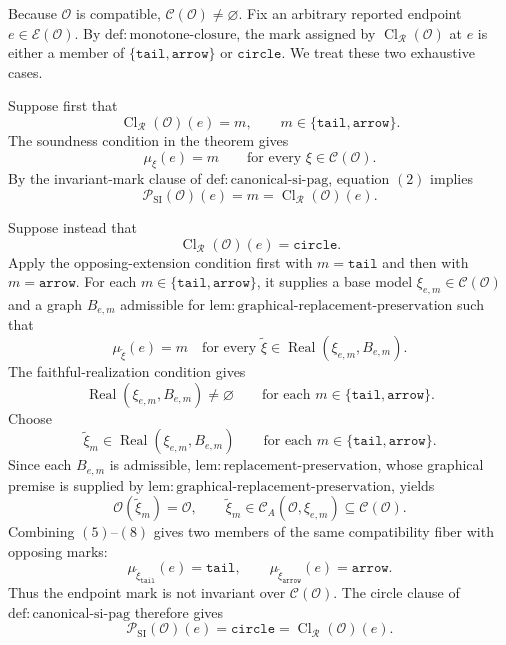 Because \(\mathcal O\) is compatible, \(\mathcal C(\mathcal O)\neq\varnothing\).  Fix an arbitrary reported endpoint \(e\in\mathcal E(\mathcal O)\).  By \(\mathrm{def:monotone\mbox{-}closure}\), the mark assigned by \(\operatorname{Cl}_{\mathcal R}(\mathcal O)\) at \(e\) is either a member of \(\{\mathtt{tail},\mathtt{arrow}\}\) or \(\mathtt{circle}\).  We treat these two exhaustive cases.

Suppose first that
\[
 \operatorname{Cl}_{\mathcal R}(\mathcal O)(e)=m,
 \qquad m\in\{\mathtt{tail},\mathtt{arrow}\}.
 \tag{1}
\]
The soundness condition in the theorem gives
\[
 \mu_\xi(e)=m
 \qquad\text{for every }\xi\in\mathcal C(\mathcal O).
 \tag{2}
\]
By the invariant-mark clause of \(\mathrm{def:canonical\mbox{-}si\mbox{-}pag}\), equation \((2)\) implies
\[
 \mathcal P_{\mathrm{SI}}(\mathcal O)(e)=m
 =\operatorname{Cl}_{\mathcal R}(\mathcal O)(e).
 \tag{3}
\]

Suppose instead that
\[
 \operatorname{Cl}_{\mathcal R}(\mathcal O)(e)=\mathtt{circle}.
 \tag{4}
\]
Apply the opposing-extension condition first with \(m=\mathtt{tail}\) and then with \(m=\mathtt{arrow}\).  For each \(m\in\{\mathtt{tail},\mathtt{arrow}\}\), it supplies a base model \(\xi_{e,m}\in\mathcal C(\mathcal O)\) and a graph \(B_{e,m}\) admissible for \(\mathrm{lem:graphical\mbox{-}replacement\mbox{-}preservation}\) such that
\[
 \mu_{\widetilde\xi}(e)=m
 \quad\text{for every }
 \widetilde\xi\in\operatorname{Real}(\xi_{e,m},B_{e,m}).
 \tag{5}
\]
The faithful-realization condition gives
\[
 \operatorname{Real}(\xi_{e,m},B_{e,m})\neq\varnothing
 \qquad\text{for each }m\in\{\mathtt{tail},\mathtt{arrow}\}.
 \tag{6}
\]
Choose
\[
 \widetilde\xi_m\in
 \operatorname{Real}(\xi_{e,m},B_{e,m})
 \qquad\text{for each }m\in\{\mathtt{tail},\mathtt{arrow}\}.
 \tag{7}
\]
Since each \(B_{e,m}\) is admissible, \(\mathrm{lem:replacement\mbox{-}preservation}\), whose graphical premise is supplied by \(\mathrm{lem:graphical\mbox{-}replacement\mbox{-}preservation}\), yields
\[
 \mathcal O(\widetilde\xi_m)=\mathcal O,
 \qquad
 \widetilde\xi_m\in\mathcal C_A(\mathcal O,\xi_{e,m})
 \subseteq\mathcal C(\mathcal O).
 \tag{8}
\]
Combining \((5)\)--\((8)\) gives two members of the same compatibility fiber with opposing marks:
\[
 \mu_{\widetilde\xi_{\mathtt{tail}}}(e)=\mathtt{tail},
 \qquad
 \mu_{\widetilde\xi_{\mathtt{arrow}}}(e)=\mathtt{arrow}.
 \tag{9}
\]
Thus the endpoint mark is not invariant over \(\mathcal C(\mathcal O)\).  The circle clause of \(\mathrm{def:canonical\mbox{-}si\mbox{-}pag}\) therefore gives
\[
 \mathcal P_{\mathrm{SI}}(\mathcal O)(e)=\mathtt{circle}
 =\operatorname{Cl}_{\mathcal R}(\mathcal O)(e).
 \tag{10}
\]

